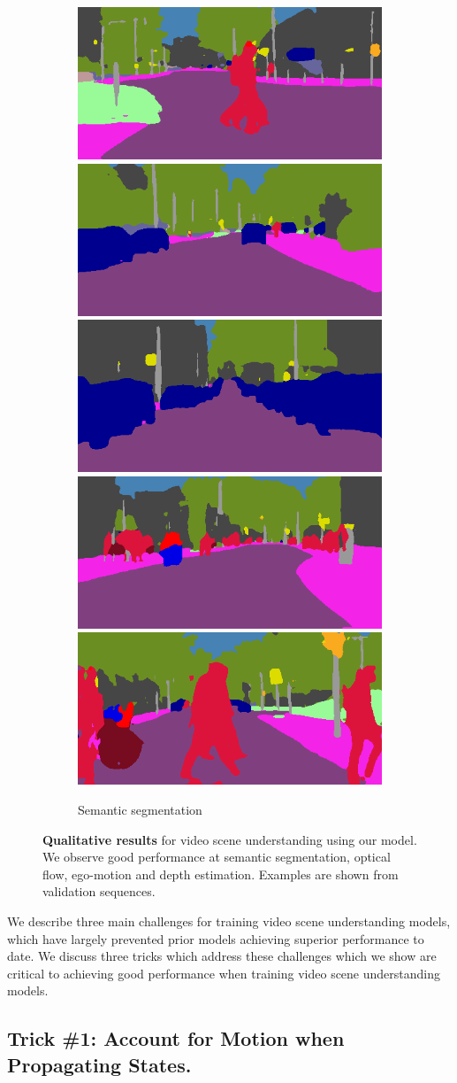 \begin{figure}[t]
\begin{subfigure}[t]{\linewidth}
\begin{center}
\includegraphics[width=0.19\linewidth]{image_000050_000019_segmentation.png}
\includegraphics[width=0.19\linewidth]{image_000045_000019_segmentation.png}
\includegraphics[width=0.19\linewidth]{image_000046_000019_segmentation.png}
\includegraphics[width=0.19\linewidth]{image_000038_000019_segmentation.png}
\includegraphics[width=0.19\linewidth]{image_000071_000019_segmentation.png}
\vspace{-2mm}
  \caption{Semantic segmentation}
\end{center}
\end{subfigure}
\vspace{-2mm}
   \caption[Qualitative results on CityScapes.]{\textbf{Qualitative results} for video scene understanding using our model. We observe good performance at semantic segmentation, optical flow, ego-motion and depth estimation. Examples are shown from validation sequences.}
\label{fig:results}
\vspace{-3mm}
\end{figure}


We describe three main challenges for training video scene understanding models, which have largely prevented prior models achieving superior performance to date. We discuss three tricks which address these challenges which we show are critical to achieving good performance when training video scene understanding models.

\subsection{Trick \#1: Account for Motion when Propagating States.} 

